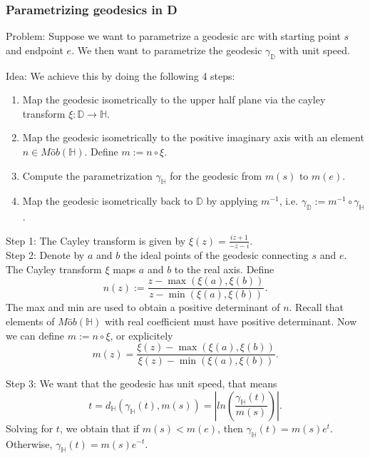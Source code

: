 \documentclass{article}
\begin{document}
\subsubsection{Parametrizing geodesics in D}
Problem: Suppose we want to parametrize a geodesic arc with starting point $s$ and endpoint $e$. 
We then want to parametrize the geodesic $\gamma_{\mathbb{D}}$ with unit speed. 

Idea: We achieve this by doing the following 4 steps:
\begin{enumerate}
	\item Map the geodesic isometrically to the upper half plane via the cayley transform $\xi:\mathbb{D}\longrightarrow\mathbb{H}$.
	\item Map the geodesic isometrically to the positive imaginary axis with an element $n\in Möb(\mathbb{H})$. Define $m:= n \circ \xi$. 
	\item Compute the parametrization $\gamma_{\mathbb{H}}$ for the geodesic from $m(s)$ to $m(e)$.
	\item Map the geodesic isometrically back to $\mathbb{D}$ by applying $m^{-1}$, i.e. $\gamma_{\mathbb{D}} := m^{-1} \circ \gamma_{\mathbb{H}}$.
\end{enumerate}

Step 1: The Cayley transform is given by $\xi(z) = \frac{iz+1}{-z-i}$. \\
Step 2: Denote by $a$ and $b$ the ideal points of the geodesic connecting $s$ and $e$. The Cayley transform $\xi$ maps $a$ and $b$ to the real axis. Define
\begin{equation*}
	n(z) := \frac{z-\max(\xi(a), \xi(b))}{z-\min(\xi(a), \xi(b))}.
\end{equation*}
The max and min are used to obtain a positive determinant of $n$. Recall that elements of $Möb(\mathbb{H})$ with real coefficient must have positive determinant. 
Now we can define $m:= n \circ \xi$, or explicitely
\begin{equation*}
	m(z) = \frac{\xi(z)-\max(\xi(a), \xi(b))}{\xi(z)-\min(\xi(a), \xi(b))}.
\end{equation*}

Step 3: We want that the geodesic has unit speed, that means
\begin{equation*}
	t = d_{\mathbb{H}}(\gamma_{\mathbb{H}}(t),m(s)) = \left| ln\left(\frac{\gamma_{\mathbb{H}}(t)}{m(s)}\right) \right|.
\end{equation*}
Solving for $t$, we obtain that if $m(s)<m(e)$, then $\gamma_{\mathbb{H}}(t) = m(s) e^{t}$. Otherwise,  $\gamma_{\mathbb{H}}(t) = m(s) e^{-t}$.
\end{document}
